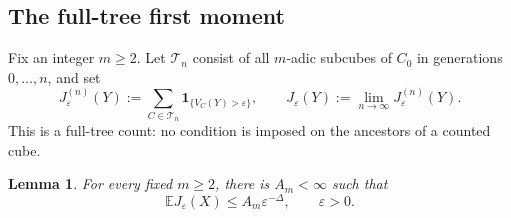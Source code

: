 \documentclass[11pt,letterpaper]{article}
\newcommand{\E}{\mathbb E}
\newcommand{\ind}{\mathbf 1}
\newcommand{\eps}{\varepsilon}
\newtheorem{lemma}[theorem]{Lemma}
\theoremstyle{definition}
\theoremstyle{remark}
\numberwithin{equation}{section}
\begin{document}
\subsection{The full-tree first moment}

Fix an integer $m\ge2$.  Let $\mathcal T_n$ consist of all $m$-adic subcubes of $C_0$ in generations $0,\ldots,n$, and set
\begin{equation}\label{mom:tree-definition}
 J_\eps^{(n)}(Y)
   :=\sum_{C\in\mathcal T_n}\ind_{\{V_C(Y)>\eps\}},
 \qquad
 J_\eps(Y):=\lim_{n\to\infty}J_\eps^{(n)}(Y).
\end{equation}
This is a full-tree count: no condition is imposed on the ancestors of a counted cube.

\begin{lemma}\label{mom:tree-l1}
For every fixed $m\ge2$, there is $A_m<\infty$ such that
\begin{equation}\label{mom:tree-l1-bound}
 \E J_\eps(X)\le A_m\eps^{-\Delta},
 \qquad \eps>0.
\end{equation}
\end{lemma}
\end{document}
